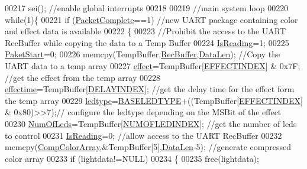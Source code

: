 \begin{DoxyCode}
{00217     sei();                                  \textcolor{comment}{//enable global interrupts}
00218 
00219     \textcolor{comment}{//main system loop}
00220     \textcolor{keywordflow}{while}(1)\{
00221         \textcolor{keywordflow}{if} (\hyperlink{globals_8h_a1b09d1a5bcf4c8ab435bb3c9e36def59}{PacketComplete}==1)    \textcolor{comment}{//new UART package containing color and effect data is
       available}
00222         \{
00223             \textcolor{comment}{//Prohibit the access to the UART RecBuffer while copying the data to a Temp Buffer}
00224             \hyperlink{globals_8h_a922ad5baed647eca43ad1a979e162ebd}{IsReading}=1;       
00225             \hyperlink{globals_8h_aaa3bddd2273257ac5ec259197b62e984}{PaketStart}=0;
00226             memcpy(TempBuffer,\hyperlink{globals_8h_a5d735865707e6694a8173d629e0b4d5c}{RecBuffer},\hyperlink{globals_8h_aaa611e00c18e950be43a4cd5ce0ceeb1}{DataLen});   \textcolor{comment}{//Copy the UART data to a temp array    }
00227             \hyperlink{globals_8h_a053b8e1f039c19251b90d60317db8aed}{effect}=TempBuffer[\hyperlink{ws2811lichterkette_8c_a8d4e4cf47dd6136ace963623e1a8e27c}{EFFECTINDEX}] & 0x7F; \textcolor{comment}{//get the effect from the temp array}
00228             \hyperlink{globals_8h_ac2445d316b2972d381edeac44bb6a226}{effectime}=TempBuffer[\hyperlink{ws2811lichterkette_8c_a9ff437877d0878dd16eacf103a1e1c40}{DELAYINDEX}];        \textcolor{comment}{//get the delay time for the effect
       form the temp array}
00229             \hyperlink{globals_8h_a722e1eb38b661d1338ada3cc7a4049a0}{ledtype}=\hyperlink{globals_8h_af07a5ce170c7be13d096843960e7b9da}{BASELEDTYPE}+((TempBuffer[\hyperlink{ws2811lichterkette_8c_a8d4e4cf47dd6136ace963623e1a8e27c}{EFFECTINDEX}] & 0x80)>>7);\textcolor{comment}{//
      configure the ledtype depending on the MSBit of the effect}
00230             \hyperlink{globals_8h_ad5db4045aed262ed4aae2af9d81fab98}{NumOfLeds}=TempBuffer[\hyperlink{ws2811lichterkette_8c_afbc75dc20761a05dda7cbb70b9b322dd}{NUMOFLEDINDEX}];  \textcolor{comment}{//get the number of leds to control}
00231             \hyperlink{globals_8h_a922ad5baed647eca43ad1a979e162ebd}{IsReading}=0;                           \textcolor{comment}{//allow access to the UART RecBuffer}
00232             memcpy(\hyperlink{globals_8h_a159854edb9d0c7283013495d85bdf997}{CompColorArray},&TempBuffer[5],\hyperlink{globals_8h_aaa611e00c18e950be43a4cd5ce0ceeb1}{DataLen}-5);   \textcolor{comment}{//generate compressed
       color array}
00233             \textcolor{keywordflow}{if} (lightdata!=NULL)
00234             \{
00235                 free(lightdata);
}
\end{DoxyCode}
